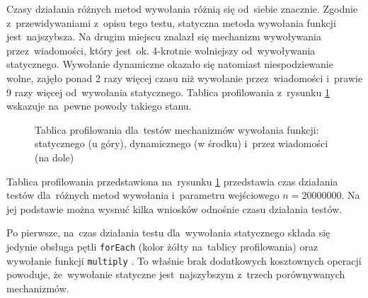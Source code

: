 \documentclass[mgr, shortabstract]{iithesis}
\newcommand{\swiftinline}[1]{
    \texttt{#1}
}
\begin{document}
Czasy działania różnych metod wywołania różnią się od~siebie znacznie. Zgodnie z~przewidywaniami z~opisu tego testu, statyczna metoda wywołania funkcji jest~najszybsza. Na drugim miejscu znalazł się mechanizm wywoływania przez~wiadomości, który jest~ok. 4-krotnie wolniejszy od~wywoływania statycznego. Wywołanie dynamiczne okazało się natomiast niespodziewanie wolne, zajęło ponad 2 razy więcej czasu niż wywołanie przez~wiadomości i~prawie 9 razy więcej od~wywołania statycznego. Tablica profilowania z~rysunku \ref{i:dispatch_method} wskazuje na~pewne powody takiego stanu.

\begin{figure}
    \caption{Tablica profilowania dla~testów mechanizmów wywołania funkcji: statycznego (u góry), dynamicznego (w środku) i~przez wiadomości (na dole)}
    \label{i:dispatch_method}
\end{figure}

Tablica profilowania przedstawiona na~rysunku \ref{i:dispatch_method} przedstawia czas działania testów dla~różnych metod wywołania i~parametru wejściowego $n = 20000000$. Na jej podstawie można wysnuć kilka wniosków odnośnie czasu działania testów.

Po pierwsze, na~czas działania testu dla~wywołania statycznego składa się jedynie obsługa pętli \swiftinline{forEach} (kolor żółty na~tablicy profilowania) oraz wywołanie funkcji \swiftinline{multiply}. To właśnie brak dodatkowych kosztownych operacji powoduje, że~wywołanie statyczne jest~najszybszym z~trzech porównywanych mechanizmów.
\end{document}
